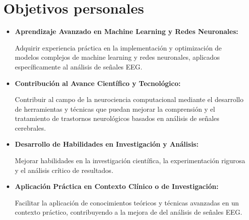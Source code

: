 \section{Objetivos  personales}


\begin{itemize}

\item
\textbf{Aprendizaje Avanzado en Machine Learning y Redes Neuronales:}

Adquirir experiencia práctica en la implementación y optimización de modelos complejos de machine learning y redes neuronales, aplicados específicamente al análisis de señales EEG.


\item
\textbf{Contribución al Avance Científico y Tecnológico:}

Contribuir al campo de la neurociencia computacional mediante el desarrollo de herramientas y técnicas que puedan mejorar la comprensión y el tratamiento de trastornos neurológicos basados en análisis de señales cerebrales.


\item
\textbf{Desarrollo de Habilidades en Investigación y Análisis:}

Mejorar habilidades en la investigación científica, la experimentación rigurosa y el análisis crítico de resultados.


\item
\textbf{Aplicación Práctica en Contexto Clínico o de Investigación:}

Facilitar la aplicación de conocimientos teóricos y técnicas avanzadas en un contexto práctico, contribuyendo a la mejora de del análisis de señales EEG.

\end{itemize}


